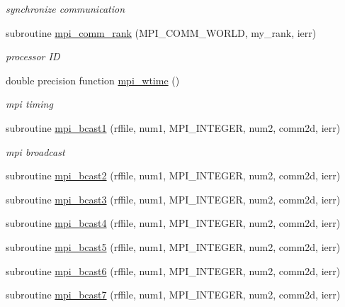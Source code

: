 \begin{DoxyCompactItemize}
\begin{DoxyCompactList}\small\item\em synchronize communication \end{DoxyCompactList}\item 
subroutine \mbox{\hyperlink{namespacempistub_a3085e38e0e5d38df633afc7b2d92cebb}{mpi\+\_\+comm\+\_\+rank}} (M\+P\+I\+\_\+\+C\+O\+M\+M\+\_\+\+W\+O\+R\+LD, my\+\_\+rank, ierr)
\begin{DoxyCompactList}\small\item\em processor ID \end{DoxyCompactList}\item 
double precision function \mbox{\hyperlink{namespacempistub_a2456432a60801629e19273ebe4114bc9}{mpi\+\_\+wtime}} ()
\begin{DoxyCompactList}\small\item\em mpi timing \end{DoxyCompactList}\item 
subroutine \mbox{\hyperlink{namespacempistub_a28c2930a0c38a6318865ef760b6e87c0}{mpi\+\_\+bcast1}} (rffile, num1, M\+P\+I\+\_\+\+I\+N\+T\+E\+G\+ER, num2, comm2d, ierr)
\begin{DoxyCompactList}\small\item\em mpi broadcast \end{DoxyCompactList}\item 
subroutine \mbox{\hyperlink{namespacempistub_a0d3b09e89256fef8bc0a4f71f7ff73c0}{mpi\+\_\+bcast2}} (rffile, num1, M\+P\+I\+\_\+\+I\+N\+T\+E\+G\+ER, num2, comm2d, ierr)
\item 
subroutine \mbox{\hyperlink{namespacempistub_ae8d4cdea848159c537f06677e1d7b712}{mpi\+\_\+bcast3}} (rffile, num1, M\+P\+I\+\_\+\+I\+N\+T\+E\+G\+ER, num2, comm2d, ierr)
\item 
subroutine \mbox{\hyperlink{namespacempistub_abe276f0cf456de80ee888e6b335a4b7d}{mpi\+\_\+bcast4}} (rffile, num1, M\+P\+I\+\_\+\+I\+N\+T\+E\+G\+ER, num2, comm2d, ierr)
\item 
subroutine \mbox{\hyperlink{namespacempistub_a79437cd731fca94bcf720d8abd6cec77}{mpi\+\_\+bcast5}} (rffile, num1, M\+P\+I\+\_\+\+I\+N\+T\+E\+G\+ER, num2, comm2d, ierr)
\item 
subroutine \mbox{\hyperlink{namespacempistub_aca21309e40e0374a92a5e2a163110d1c}{mpi\+\_\+bcast6}} (rffile, num1, M\+P\+I\+\_\+\+I\+N\+T\+E\+G\+ER, num2, comm2d, ierr)
\item 
subroutine \mbox{\hyperlink{namespacempistub_a5557aded89a597293b1fda3138bce902}{mpi\+\_\+bcast7}} (rffile, num1, M\+P\+I\+\_\+\+I\+N\+T\+E\+G\+ER, num2, comm2d, ierr)

\end{DoxyCompactItemize}
